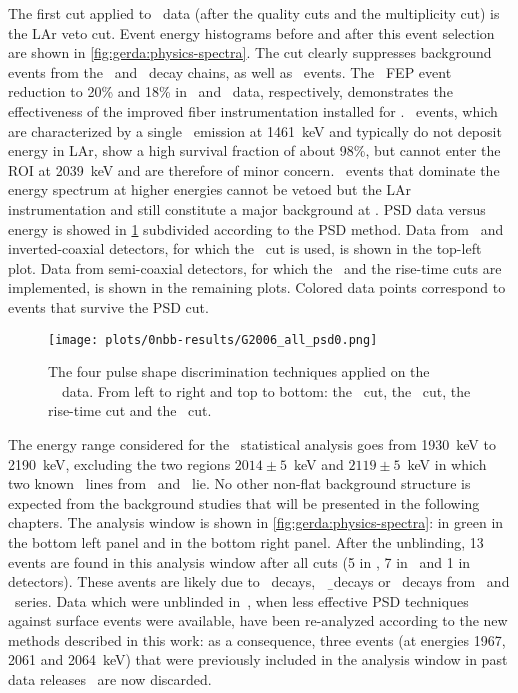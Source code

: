 The first cut applied to \phasetwo\ data (after the quality cuts and the multiplicity cut)
is the LAr veto cut.  Event energy histograms before and after this event selection are
shown in \cref{fig:gerda:physics-spectra}. The cut clearly suppresses background events from
the \Th\ and \Uh\ decay chains, as well as \kvz\ events. The \kvz\ FEP event reduction to
20\% and 18\% in \phasetwo\ and \phasetwop\ data, respectively, demonstrates the
effectiveness of the improved fiber instrumentation installed for \phasetwop. \kvn\
events, which are characterized by a single \g\ emission at 1461~keV and typically do not
deposit energy in LAr, show a high survival fraction of about 98\%, but cannot enter the
ROI at 2039~keV and are therefore of minor concern. \a\ events that dominate the energy
spectrum at higher energies cannot be vetoed but the LAr instrumentation and still
constitute a major background at \qbb.
\newpar
PSD data versus energy is showed in \cref{fig:gerda:psd-on-data} subdivided according to
the PSD method. Data from \bege\ and inverted-coaxial detectors, for which the \aoe\ cut
is used, is shown in the top-left plot. Data from semi-coaxial detectors, for which the
\annmse\ and the rise-time cuts are implemented, is shown in the remaining plots. Colored
data points correspond to events that survive the PSD cut.

\begin{figure}
  \centering
  \texttt{[image: plots/0nbb-results/G2006\_all\_psd0.png]}%
  \caption{%
    The four pulse shape discrimination techniques applied on the \gerda\ \phasetwo\
    data. From left to right and top to bottom: the \aoe\ cut, the \annmse\ cut, the
    rise-time cut and the \deltae\ cut. \fillme{to be updated with final plots}
  }\label{fig:gerda:psd-on-data}
\end{figure}

The energy range considered for the \onbb\ statistical analysis goes from 1930~keV to
2190~keV, excluding the two regions $2014 \pm 5$~keV and $2119 \pm 5$~keV in which two
known \g\ lines from \Bih\ and \Tl\ lie. No other non-flat background structure is
expected from the background studies that will be presented in the following chapters.
The analysis window is shown in \cref{fig:gerda:physics-spectra}: in green in the bottom
left panel and in the bottom right panel. After the unblinding, 13 events are found in
this analysis window after all cuts (5 in \scoax, 7 in \bege\ and 1 in \icoax detectors).
These avents are likely due to \a\ decays, \kvz\ \b\ decays or \g\ decays from \Uh\ and
\Thh\ series. Data which were unblinded in~\cite{Agostini2017}, when less effective PSD
techniques against surface events were available, have been re-analyzed according to the
new methods described in this work: as a consequence, three events (at energies 1967, 2061
and 2064~keV) that were previously included in the analysis window in past data
releases~\cite{Agostini2019a, Agostini2017, Agostini2018} are now discarded.


